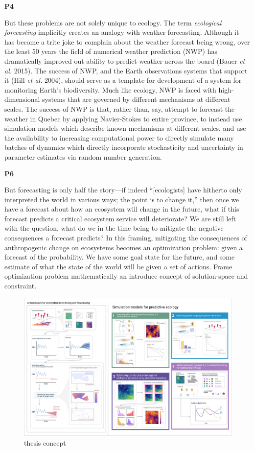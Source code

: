 \documentclass[10pt,oneside]{article}
\makeatletter
\def\maxwidth{\ifdim\Gin@nat@width>\linewidth\linewidth
\else\Gin@nat@width\fi}
\let\Oldincludegraphics\includegraphics
\renewcommand{\includegraphics}[1]{\Oldincludegraphics[width=\maxwidth]{#1}}
\makeatother
\begin{document}
\textbf{P4}

But these problems are not solely unique to ecology. The term
\emph{ecological forecasting} implicitly creates an analogy with weather
forecasting. Although it has become a trite joke to complain about the
weather forecast being wrong, over the least 50 years the field of
numerical weather prediction (NWP) has dramatically improved out ability
to predict weather across the board (Bauer \emph{et al.} 2015). The
success of NWP, and the Earth observations systems that support it (Hill
\emph{et al.} 2004), should serve as a template for development of a
system for monitoring Earth's biodiversity. Much like ecology, NWP is
faced with high-dimensional systems that are governed by different
mechanisms at different scales. The success of NWP is that, rather than,
say, attempt to forecast the weather in Quebec by applying Navier-Stokes
to entire province, to instead use simulation models which describe
known mechanisms at different scales, and use the availability to
increasing computational power to directly simulate many batches of
dynamics which directly incorporate stochasticity and uncertainty in
parameter estimates via random number generation.

\textbf{P6}

But forecasting is only half the story---if indeed ``{[}ecologists{]}
have hitherto only interpreted the world in various ways; the point is
to change it,'' then once we have a forecast about how an ecosystem will
change in the future, what if this forecast predicts a critical
ecosystem service will deteriorate? We are still left with the question,
what do we in the time being to mitigate the negative consequences a
forecast predicts? In this framing, mitigating the consequences of
anthropogenic change on ecosystems becomes an optimization problem:
given a forecast of the probability. We have some goal state for the
future, and some estimate of what the state of the world will be given a
set of actions. Frame optimization problem mathematically an introduce
concept of solution-space and constraint.

\begin{figure}
\hypertarget{fig:thesis}{%
\centering
\includegraphics{./figures/thesisconcept.png}
\caption{thesis concept}\label{fig:thesis}
}
\end{figure}
\end{document}

